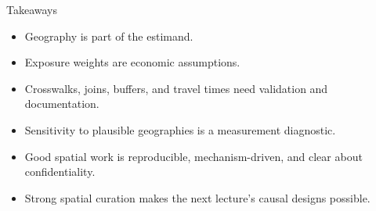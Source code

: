 \documentclass[aspectratio=169,11pt]{beamer}
\newcommand{\1}{\mathbf{1}}
\begin{document}
\begin{frame}{Takeaways}
\begin{itemize}
    \item Geography is part of the estimand.
    \item Exposure weights are economic assumptions.
    \item Crosswalks, joins, buffers, and travel times need validation and documentation.
    \item Sensitivity to plausible geographies is a measurement diagnostic.
    \item Good spatial work is reproducible, mechanism-driven, and clear about confidentiality.
    \item Strong spatial curation makes the next lecture's causal designs possible.
\end{itemize}
\end{frame}
\end{document}
